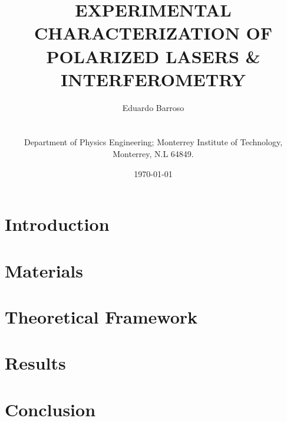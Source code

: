 \documentclass{document_layout}
\title{EXPERIMENTAL CHARACTERIZATION OF
POLARIZED LASERS \& INTERFEROMETRY}
\author{
    Eduardo Barroso \address{1} \\[0.3em]
    {\scriptsize
        \address{1} Department of Physics Engineering; Monterrey Institute of Technology, Monterrey, N.L 64849.\\
    }
}
\date{\today}
\begin{document}
\maketitle
    
\section{Introduction}


\section{Materials}


\section{Theoretical Framework}


\section{Results}



\section{Conclusion}


\onecolumn
\printbibliography
\twocolumn
\end{document}
